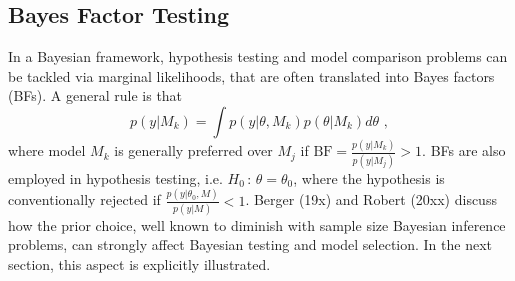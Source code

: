 \documentclass[12pt,epsf]{article}
\begin{document}
\subsection{Bayes Factor Testing}
In a Bayesian framework, hypothesis testing and model comparison problems can be tackled via marginal likelihoods, that are often
translated into Bayes factors (BFs). A general rule is that
$$ p(y|M_k) = \int p(y|\theta, M_k) p(\theta | M_k) d \theta \,\, ,$$
where model $M_k$ is generally preferred over $M_j$ if
$\mbox{BF} =\frac{p(y| M_k)}{p(y|M_j)} > 1$. BFs are also employed in hypothesis testing, i.e.  $H_{0}\, : \, \theta= \theta_0$,
where the hypothesis is conventionally rejected if $\frac{p(y|\theta_0, M)}{p(y|M)} < 1$. Berger (19x) and Robert (20xx) discuss how
the prior choice, well known to diminish with sample size Bayesian inference problems, can strongly affect Bayesian testing and model
selection. In the next section, this aspect is explicitly illustrated.
\end{document}
